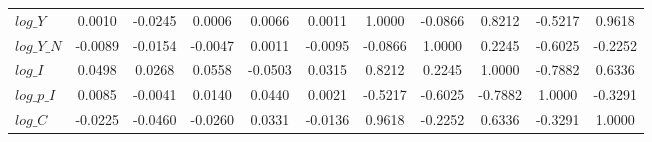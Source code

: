 \begin{center}
\begin{longtable}{lcccccccccc}
$log\_Y          $	 & 	            0.0010	 & 	           -0.0245	 & 	            0.0006	 & 	            0.0066	 & 	            0.0011	 & 	            1.0000	 & 	           -0.0866	 & 	            0.8212	 & 	           -0.5217	 & 	            0.9618 \\ 
$log\_Y\_N       $	 & 	           -0.0089	 & 	           -0.0154	 & 	           -0.0047	 & 	            0.0011	 & 	           -0.0095	 & 	           -0.0866	 & 	            1.0000	 & 	            0.2245	 & 	           -0.6025	 & 	           -0.2252 \\ 
$log\_I          $	 & 	            0.0498	 & 	            0.0268	 & 	            0.0558	 & 	           -0.0503	 & 	            0.0315	 & 	            0.8212	 & 	            0.2245	 & 	            1.0000	 & 	           -0.7882	 & 	            0.6336 \\ 
$log\_p\_I       $	 & 	            0.0085	 & 	           -0.0041	 & 	            0.0140	 & 	            0.0440	 & 	            0.0021	 & 	           -0.5217	 & 	           -0.6025	 & 	           -0.7882	 & 	            1.0000	 & 	           -0.3291 \\ 
$log\_C          $	 & 	           -0.0225	 & 	           -0.0460	 & 	           -0.0260	 & 	            0.0331	 & 	           -0.0136	 & 	            0.9618	 & 	           -0.2252	 & 	            0.6336	 & 	           -0.3291	 & 	            1.0000 \\ 
\end{longtable}
 \end{center}
